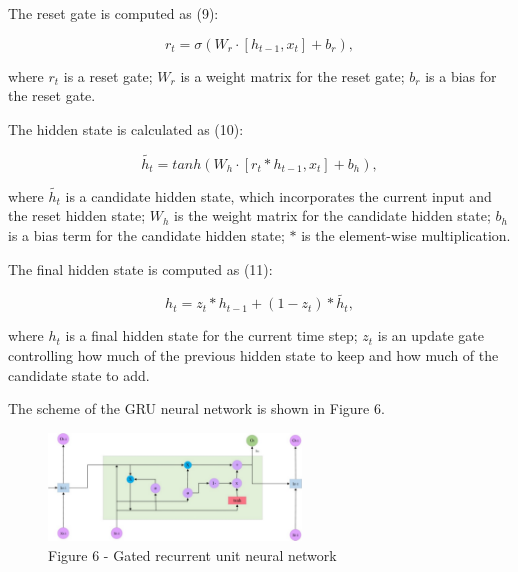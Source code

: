 \begin{multicols}{2}
The reset gate is computed as (9):

\begin{equation}
r_t=\sigma(W_r\cdot[h_{t-1},x_t]+b_r),
\end{equation}

where $r_t$ is a reset gate;
$W_r$ is a weight matrix for the reset gate;
$b_r$ is a bias for the reset gate.

The hidden state is calculated as (10):

\begin{equation}
\tilde{h_t}=tanh(W_h\cdot[r_t*h_{t-1},x_t]+b_h),
\end{equation}

where $\tilde{h_t}$ is a
candidate hidden state, which incorporates the current input and the
reset hidden state;
$W_h$ is the weight matrix for the candidate hidden state;
$b_h$ is a bias term for the candidate hidden state;
$*$ is the element-wise multiplication.

The final hidden state is computed as (11):

\begin{equation}
h_t=z_t*h_{t-1}+(1-z_t)*\tilde{h_t},
\end{equation}

where $h_t$ is a final hidden state for the current time step; $z_t$ is an update
gate controlling how much of the previous hidden state to keep and how
much of the candidate state to add.

The scheme of the GRU neural network is shown in Figure 6.
\end{multicols}

\begin{figure}[H]
	\centering
	\includegraphics[width=0.6\textwidth]{media/ict/image79}
	\caption*{Figure 6 - Gated recurrent unit neural network}
\end{figure}

